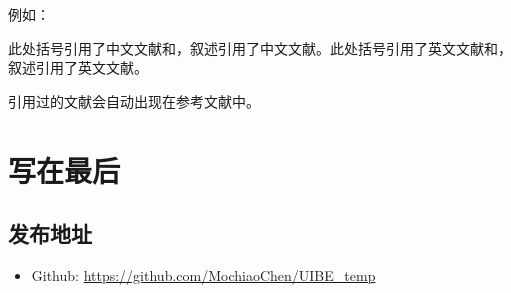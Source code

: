 \documentclass[12pt,hyperref,a4paper,UTF8]{ctexart}
\begin{document}
例如：

   此处括号引用了中文文献\parencite{xu2017}和\parencite{wang2014}，叙述引用了中文文献\textcite{xu2017}。此处括号引用了英文文献\parencite{todaro1969}和\parencite{banister1990}，叙述引用了英文文献\textcite{todaro1969}。

引用过的文献会自动出现在参考文献中。

\section{写在最后}
\subsection{发布地址}
\begin{itemize}
    \item Github: \url{https://github.com/MochiaoChen/UIBE_temp}
\end{itemize}


\end{document}
